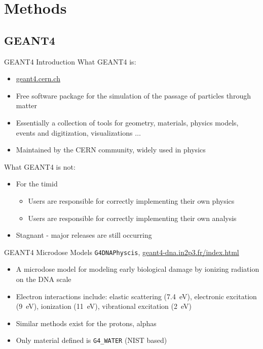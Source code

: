 \documentclass[compress]{beamer}
\begin{document}
\section{Methods}
\subsection{GEANT4}
\begin{frame}[fragile]{GEANT4 Introduction}
What GEANT4 is:
\begin{itemize}
  \small
  \item \href{geant4.cern.ch}{geant4.cern.ch}
  \item Free software package for the simulation of the passage of particles through matter
  \item Essentially a collection of tools for geometry, materials, physics models, events and digitization, visualizations $\dots$
  \item Maintained by the CERN community, widely used in physics
\end{itemize}
What GEANT4 is not:
\begin{itemize}
  \small
  \item For the timid
  \begin{itemize}
    \item Users are responsible for correctly implementing their own physics
    \item Users are responsible for correctly implementing their own analysis
  \end{itemize}
  \item Stagnant - major releases are still occurring
\end{itemize}
\end{frame}
\begin{frame}[fragile]{GEANT4 Microdose Models}
\verb+G4DNAPhyscis+, \href{geant4-dna.in2p3.fr}{geant4-dna.in2p3.fr/index.html}
  \begin{itemize}
    \item A microdose model for modeling early biological damage by ionizing radiation on the DNA scale
    \item Electron interactions include: elastic scattering (\SI{7.4}{\eV}), electronic excitation (\SI{9}{\eV}), ionization (\SI{11}{\eV}), vibrational excitation (\SI{2}{\eV})
    \item Similar methods exist for the protons, alphas
    \item Only material defined is \verb+G4_WATER+ (NIST based)
  \end{itemize}
\end{frame}
\end{document}

